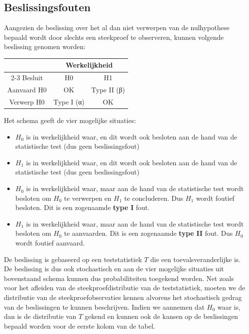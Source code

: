 \documentclass[
  dutch,
  letterpaper,
  12pt]{book}
\theoremstyle{definition}
\theoremstyle{definition}
\theoremstyle{definition}
\theoremstyle{remark}
\begin{document}
\subsection{Beslissingsfouten}\label{beslissingsfouten}

Aangezien de beslissing over het al dan niet verwerpen van de
nulhypothese bepaald wordt door slechts een steekproef te observeren,
kunnen volgende beslissing genomen worden:

\begin{table}
\centering
\begin{tabular}{c|c|c}
\hline
\multicolumn{1}{c|}{ } & \multicolumn{2}{c}{Werkelijkheid} \\
\cline{2-3}
Besluit & H0 & H1\\
\hline
Aanvaard H0 & OK & Type II (β)\\
\hline
Verwerp H0 & Type I (α) & OK\\
\hline
\end{tabular}
\end{table}

Het schema geeft de vier mogelijke situaties:

\begin{itemize}
\item
  \(H_0\) is in werkelijkheid waar, en dit wordt ook besloten aan de
  hand van de statistische test (dus geen beslissingsfout)
\item
  \(H_1\) is in werkelijkheid waar, en dit wordt ook besloten aan de
  hand van de statistische test (dus geen beslissingsfout)
\item
  \(H_0\) is in werkelijkheid waar, maar aan de hand van de statistische
  test wordt besloten om \(H_0\) te verwerpen en \(H_1\) te concluderen.
  Dus \(H_1\) wordt foutief besloten. Dit is een zogenaamde \textbf{type
  I} fout.
\item
  \(H_1\) is in werkelijkheid waar, maar aan de hand van de statistische
  test wordt besloten om \(H_0\) te aanvaarden. Dit is een zogenaamde
  \textbf{type II} fout. Dus \(H_0\) wordt foutief aanvaard.
\end{itemize}

De beslissing is gebaseerd op een teststatistiek \(T\) die een
toevalsveranderlijke is. De beslissing is dus ook stochastisch en aan de
vier mogelijke situaties uit bovenstaand schema kunnen dus
probabiliteiten toegekend worden. Net zoals voor het afleiden van de
steekproefdistributie van de teststatistiek, moeten we de distributie
van de steekproefobservaties kennen alvorens het stochastisch gedrag van
de beslissingen te kunnen beschrijven. Indien we aannemen dat \(H_0\)
waar is, dan is de distributie van \(T\) gekend en kunnen ook de kansen
op de beslissingen bepaald worden voor de eerste kolom van de tabel.
\end{document}
